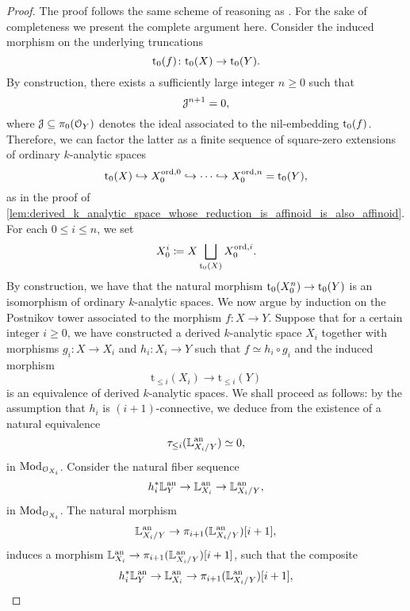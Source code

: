 \documentclass[10pt,a4paper,reqno]{amsart} %
\theoremstyle{plain}
\theoremstyle{definition}
\theoremstyle{remark}
\numberwithin{equation}{section}
\begin{document}
\begin{proof}
    The proof follows the same scheme of reasoning as \cite[Proposition 5.5.3]{Gaitsgory_Study_II}. For the sake of completeness we present the complete argument here.
    Consider the induced morphism on the underlying truncations
        \[
            \mathrm{t}_0(f) \colon \mathrm{t}_0(X) \to \mathrm{t}_0(Y).   
        \]
    By construction, there exists a sufficiently large integer $n \ge 0$ such that
        \[
            \mathcal J^{n+1} = 0,  
        \]
    where $\mathcal J \subseteq \pi_0(\mathcal O_Y)$ denotes the ideal associated to the nil-embedding $\mathrm{t}_0(f)$.
    Therefore, we can factor the latter as a finite sequence of square-zero extensions of ordinary $k$-analytic spaces
        \[
            \mathrm{t}_0(X) \hookrightarrow X_0^{\mathrm{ord}, 0} \hookrightarrow \dots \hookrightarrow X^{\mathrm{ord}, n}_0 = \mathrm{t}_0(Y),
        \]
    as in the proof of \cref{lem:derived_k_analytic_space_whose_reduction_is_affinoid_is_also_affinoid}. For each $0 \le i \le n$, we set
        \[
            X_0^i \coloneqq X \bigsqcup_{\mathrm{t}_0(X)} X_0^{\mathrm{ord}, i}.
        \]
    By construction, we have that the natural morphism $\mathrm{t}_0(X_0^n) \to \mathrm{t}_0(Y)$ is an isomorphism of ordinary $k$-analytic spaces.
    We now argue by induction on the Postnikov tower associated to the morphism $f \colon X \to Y$.
    Suppose that for a certain integer $i \ge 0$, we have constructed a derived $k$-analytic space $X_i$ together with morphisms $g_i \colon
    X \to X_i$ and $h_i \colon X_i \to Y$ such that $f \simeq h_i \circ g_i$
    and the induced morphism
        \[
            \mathrm{t}_{\le i}(X_i) \to \mathrm{t}_{\le i}(Y)
        \]
    is an equivalence of derived $k$-analytic spaces. We shall proceed as follows: by the assumption that $h_i$ is $(i+1)$-connective, we deduce from
    \cite[Proposition 5.34]{Porta_Yu_Representability} the existence of a natural equivalence
        \[
            \tau_{\le i}(\mathbb L_{X_i/Y}^\mathrm{an}) \simeq 0,
        \]
    in $\mathrm{Mod}_{\mathcal O_{X_i}}$. Consider the natural fiber sequence
        \[
            h_i^* \mathbb L^\mathrm{an}_{Y} \to \mathbb L^\mathrm{an}_{X_i} \to \mathbb L^\mathrm{an}_{X_i/Y},
        \]
    in $\mathrm{Mod}_{\mathcal O_{X_i}}$. The natural morphism
        \[
            \mathbb L^\mathrm{an}_{X_i/ Y} \to \pi_{i+1}(\mathbb L^\mathrm{an}_{X_i/Y})[i+1],  
        \]
    induces a morphism $\mathbb L^\mathrm{an}_{X_i} \to \pi_{i+1}(\mathbb L^\mathrm{an}_{X_i/Y})[i+1]$, such that the composite
        \begin{equation} \label{eq:fiber_sequence_of_cotangent_complexes_to_produce_the_existence_of_the_desired_square_zero_extension_approximating_Y_in_degree_i+1}
            h_i^* \bbL\an_{Y} \to \bbL\an_{X_i} \to \pi_{i+1}(\bbL\an_{X_i/Y})[i+1],  

\end{equation}
\end{proof}
\end{document}
